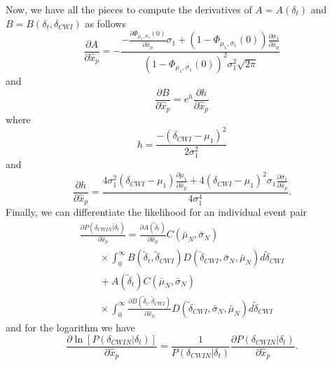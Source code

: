 \documentclass[extra, onecolumn, doublespacing]{gji}
\begin{document}
Now, we have all the pieces to compute the derivatives of $A=A(\delta_t)$ and $B = B(\delta_t,\delta_{CWI})$ as follows
\begin{equation}
\frac{\partial A} {\partial \hat{x}_p} =
-\frac{ -\frac{\partial  \Phi_{\mu_1,\sigma_1}(0)}{\partial \hat{x}_p} \sigma_1 +
 \left(1- \Phi_{\mu_1,\sigma_1}(0) \right) \frac{\partial \sigma_1}{\partial \hat{x}_p}}
{\left(1- \Phi_{\mu_1,\sigma_1}(0) \right)^2 \sigma_1^2 \sqrt{2 \pi}}
\end{equation}
and
\begin{equation}
\frac{\partial B} {\partial \hat{x}_p} = e^h \frac{\partial h}{\partial \hat{x}_p}
\end{equation}
where
\begin{equation}
h =  \frac{-(\delta_{CWI}-\mu_1)^2}{2 \sigma_1^2}
\end{equation}
and
\begin{equation}
\frac{\partial h}{\partial \hat{x}_p} = \frac{
4 \sigma_1^2 (\delta_{CWI}-\mu_1) \frac{\partial \mu_1}{\partial \hat{x}_p}
+ 4(\delta_{CWI}-\mu_1)^2 \sigma_1 \frac{\partial \sigma_1}{\partial \hat{x}_p} }
{4 \sigma_1^4}.
\end{equation}
Finally, we can differentiate the likelihood for an individual event pair
\begin{equation}
\begin{array}{l}
\frac{\partial P(\delta_{CWIN}|\widetilde{\delta}_t)} {\partial \hat{x}_p}  =
\frac{\partial A(\widetilde{\delta}_t)}{\partial \hat{x}_p} C(\bar{\mu}_N, \bar{\sigma}_N) \\
\hspace{2em} \times \int_0^\infty B(\widetilde{\delta}_t,\widetilde{\delta}_{CWI})
D(\widetilde{\delta}_{CWI},\bar{\sigma}_N,\bar{\mu}_N )
d\widetilde{\delta}_{CWI} \\
\hspace{2em} + A(\widetilde{\delta}_t) C(\bar{\mu}_N, \bar{\sigma}_N) \\
\hspace{2em} \times \int_0^\infty
\frac{\partial B(\widetilde{\delta}_t,\widetilde{\delta}_{CWI})} {\partial \hat{x}_p}
D(\widetilde{\delta}_{CWI},\bar{\sigma}_N,\bar{\mu}_N )
d\widetilde{\delta}_{CWI}
\end{array}
\end{equation}
and for the logarithm we have
\begin{equation}
\frac{ \partial \ln \left[ P(\delta_{CWIN}|\delta_t) \right] } {\partial \hat{x}_p}
= \frac{1}{P(\delta_{CWIN}|\delta_t)} \frac{\partial P(\delta_{CWIN}|\delta_t)}{\partial \hat{x}_p}.
\end{equation}
\end{document}
